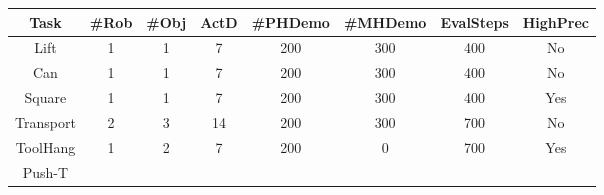 \setlength\tabcolsep{2 pt}
\begin{tabular}{c|ccccccc}
\toprule
Task      & \#Rob & \#Obj & ActD & \#PHDemo & \#MHDemo & EvalSteps & HighPrec \\
\midrule
Lift      & 1      & 1      & 7    & 200   & 300   & 400       & No       \\
Can       & 1      & 1      & 7    & 200   & 300   & 400       & No       \\
Square    & 1      & 1      & 7    & 200   & 300   & 400       & Yes      \\
Transport & 2      & 3      & 14   & 200   & 300   & 700       & No       \\
ToolHang  & 1      & 2      & 7    & 200   & 0     & 700       & Yes     \\
Push-T
\bottomrule
\end{tabular}
